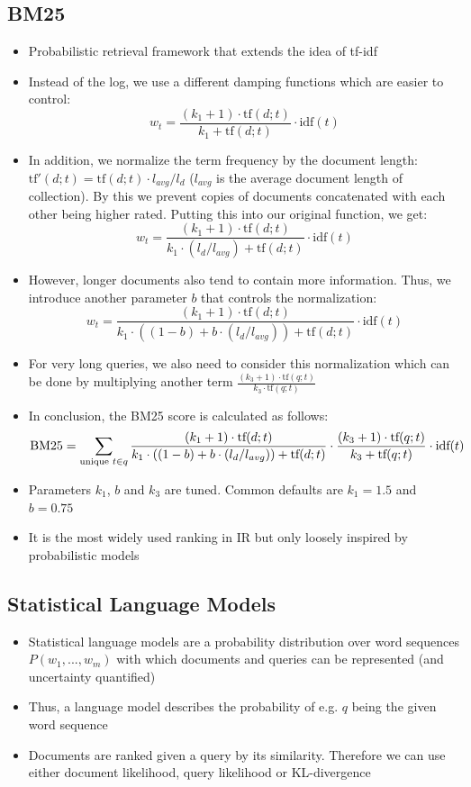 \subsection{BM25}
\begin{itemize}
	\item Probabilistic retrieval framework that extends the idea of tf-idf
	\item Instead of the log, we use a different damping functions which are easier to control:
	$$w_t = \frac{(k_1 + 1)\cdot \text{tf}(d;t)}{k_1 + \text{tf}(d;t)}\cdot \text{idf}(t)$$
	\item In addition, we normalize the term frequency by the document length: $\text{tf}'(d;t) = \text{tf}(d;t) \cdot l_{avg}/l_{d}$ ($l_{avg}$ is the average document length of collection). By this we prevent copies of documents concatenated with each other being higher rated. Putting this into our original function, we get:
	$$w_t = \frac{(k_1 + 1) \cdot \text{tf}(d;t)}{k_1 \cdot (l_d / l_{avg})+ \text{tf}(d;t)}\cdot \text{idf}(t)$$
	\item However, longer documents also tend to contain more information. Thus, we introduce another parameter $b$ that controls the normalization:
	$$w_t = \frac{(k_1 + 1) \cdot \text{tf}(d;t)}{k_1 \cdot ((1-b) + b\cdot (l_d / l_{avg}))+ \text{tf}(d;t)}\cdot \text{idf}(t)$$
	\item For very long queries, we also need to consider this normalization which can be done by multiplying another term $\frac{(k_3 + 1)\cdot \text{tf}(q;t)}{k_3 \cdot \text{tf}(q;t)}$
	\item In conclusion, the BM25 score is calculated as follows:
	$$\text{BM25} = \sum\limits_{\text{unique\hspace{1mm}} t\in q} \frac{(k_1 + 1) \cdot \text{tf}(d;t)}{k_1 \cdot ((1-b) + b\cdot (l_d / l_{avg}))+ \text{tf}(d;t)} \cdot \frac{(k_3 + 1)\cdot \text{tf}(q;t)}{k_3 + \text{tf}(q;t)} \cdot \text{idf}(t)$$
	\item Parameters $k_1$, $b$ and $k_3$ are tuned. Common defaults are $k_1 = 1.5$ and $b=0.75$
	\item It is the most widely used ranking in IR but only loosely inspired by probabilistic models
\end{itemize}
\subsection{Statistical Language Models}
\begin{itemize}
	\item Statistical language models are a probability distribution over word sequences $P(w_1, ..., w_m)$ with which documents and queries can be represented (and uncertainty quantified)
	\item Thus, a language model describes the probability of e.g. $q$ being the given word sequence
	\item Documents are ranked given a query by its similarity. Therefore we can use either document likelihood, query likelihood or KL-divergence
\end{itemize}
